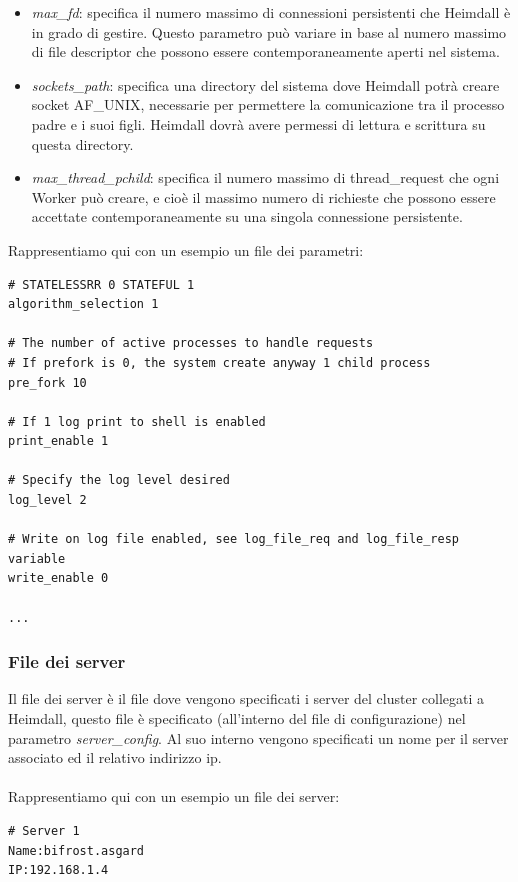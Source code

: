 \documentclass[italian]{tktltiki2}
\begin{document}
\begin{itemize}
  \item \emph{max\_fd}: specifica il numero massimo di connessioni persistenti che Heimdall è in grado di gestire. Questo parametro può variare in base al numero massimo di file descriptor che possono essere contemporaneamente aperti nel sistema.
  
  \item \emph{sockets\_path}: specifica una directory del sistema dove Heimdall potrà creare socket AF\_UNIX, necessarie per permettere la comunicazione tra il processo padre e i suoi figli. Heimdall dovrà avere permessi di lettura e scrittura su questa directory.
  
  \item \emph{max\_thread\_pchild}: specifica il numero massimo di thread\_request che ogni Worker può creare, e cioè il massimo numero di richieste che possono essere accettate contemporaneamente su una singola connessione persistente.
  
\end{itemize}
Rappresentiamo qui con un esempio un file dei parametri:

\begin{lstlisting}
# STATELESSRR 0 STATEFUL 1
algorithm_selection 1

# The number of active processes to handle requests
# If prefork is 0, the system create anyway 1 child process
pre_fork 10

# If 1 log print to shell is enabled
print_enable 1

# Specify the log level desired
log_level 2

# Write on log file enabled, see log_file_req and log_file_resp variable
write_enable 0

...
\end{lstlisting}

\subsubsection{File dei server}
\label{ssec:config_server}
Il file dei server è il file dove vengono specificati i server del cluster collegati a Heimdall, questo file è specificato (all'interno del file di configurazione) nel parametro \emph{server\_config}. Al suo interno vengono specificati un nome per il server associato ed il relativo indirizzo ip.
\\
\\
Rappresentiamo qui con un esempio un file dei server:

\begin{lstlisting}
# Server 1
Name:bifrost.asgard
IP:192.168.1.4
\end{lstlisting}
\end{document}
